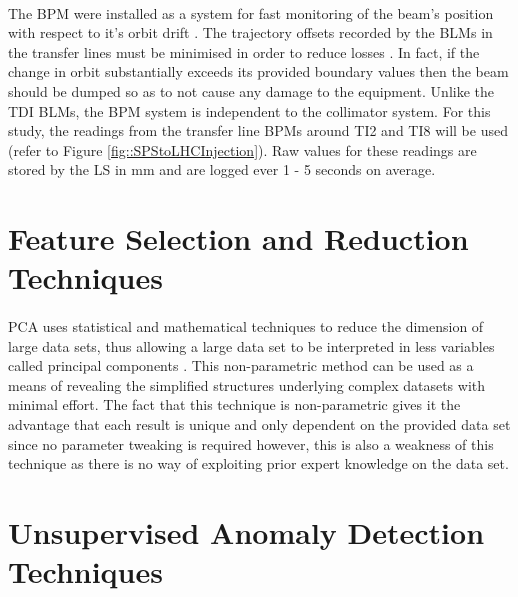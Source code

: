 \paragraph{ }The \ac{BPM} were installed as a system for fast monitoring of the beam's position with respect to it's orbit drift \cite{Schmidt2006}. The trajectory offsets recorded by the \acs{BLM}s in the transfer lines must be minimised in order to reduce losses \cite{Drosdal2011}. In fact, if the change in orbit substantially exceeds its provided boundary values then the beam should be dumped \cite{Schmidt2006} so as to not cause any damage to the equipment. Unlike the \acs{TDI} \acs{BLM}s, the \acs{BPM} system is independent to the collimator system. For this study, the readings from the transfer line \acs{BPM}s around TI2 and TI8 will be used (refer to Figure \ref{fig::SPStoLHCInjection}). Raw values for these readings are stored by the \acs{LS} in \ac{mm} and are logged ever 1 - 5 seconds on average.






\section{Feature Selection and Reduction Techniques}


\paragraph{ } \acs{PCA} uses statistical and mathematical techniques to reduce the dimension of large data sets, thus allowing a large data set to be interpreted in less variables called principal components \cite{Richardson2009}. This non-parametric method can be used as a means of revealing the simplified structures underlying complex datasets with minimal effort. The fact that this technique is non-parametric gives it the advantage that each result is unique and only dependent on the provided data set since no parameter tweaking is required \cite{Shlens2014} however, this is also a weakness of this technique as there is no way of exploiting prior expert knowledge on the data set.




\section{Unsupervised Anomaly Detection Techniques}